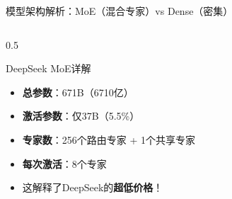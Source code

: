 \documentclass[aspectratio=169,11pt]{beamer}
\begin{document}
\begin{frame}{模型架构解析：MoE（混合专家）vs Dense（密集）}
\begin{columns}
\begin{column}{0.5\textwidth}
            \vspace{0.2cm}
            \begin{block}{DeepSeek MoE详解}
                \scriptsize
                \begin{itemize}
                    \item \textbf{总参数}：671B（6710亿）
                    \item \textbf{激活参数}：仅37B（5.5\%）
                    \item \textbf{专家数}：256个路由专家 + 1个共享专家
                    \item \textbf{每次激活}：8个专家
                    \item 这解释了DeepSeek的\textbf{超低价格}！
                \end{itemize}
            \end{block}
        \end{column}
    \end{columns}
\end{frame}
\end{document}
